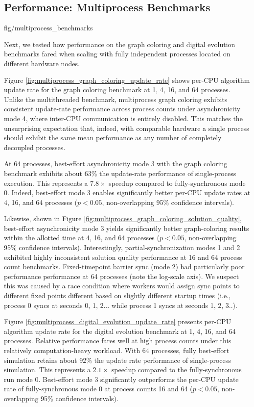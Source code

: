 \subsection{Performance: Multiprocess Benchmarks}
\label{sec:multiprocess-benchmarks}

{fig/multiprocess_benchmarks}

Next, we tested how performance on the graph coloring and digital evolution benchmarks fared when scaling with fully independent processes located on different hardware nodes.

Figure \ref{fig:multiprocess_graph_coloring_update_rate} shows per-CPU algorithm update rate for the graph coloring benchmark at 1, 4, 16, and 64 processes.
Unlike the multithreaded benchmark, multiprocess graph coloring exhibits consistent update-rate performance across process counts under asynchronicity mode 4, where inter-CPU communication is entirely disabled.
This matches the unsurprising expectation that, indeed, with comparable hardware a single process should exhibit the same mean performance as any number of completely decoupled processes.

At 64 processes, best-effort asynchronicity mode 3 with the graph coloring benchmark exhibits about 63\% the update-rate performance of single-process execution.
This represents a $7.8\times$ speedup compared to fully-synchronous mode 0.
Indeed, best-effort mode 3 enables significantly better per-CPU update rates at 4, 16, and 64 processes ($p < 0.05$, non-overlapping 95\% confidence intervals).

Likewise, shown in Figure \ref{fig:multiprocess_graph_coloring_solution_quality}, best-effort asynchronicity mode 3 yields significantly better graph-coloring results within the allotted time at 4, 16, and 64 processes ($p < 0.05$, non-overlapping 95\% confidence intervals).
Interestingly, partial-synchronization modes 1 and 2 exhibited highly inconsistent solution quality performance at 16 and 64 process count benchmarks.
Fixed-timepoint barrier sync (mode 2) had particularly poor performance performance at 64 processes (note the log-scale axis).
We suspect this was caused by a race condition where workers would assign sync points to different fixed points different based on slightly different startup times (i.e., process 0 syncs at seconds 0, 1, 2... while process 1 syncs at seconds 1, 2, 3..).

Figure \ref{fig:multiprocess_digital_evolution_update_rate} presents per-CPU algorithm update rate for the digital evolution benchmark at 1, 4, 16, and 64 processes.
Relative performance fares well at high process counts under this relatively computation-heavy workload.
With 64 processes, fully best-effort simulation retains about 92\% the update rate performance of single-process simulation.
This represents a $2.1\times$ speedup compared to the fully-synchronous run mode 0.
Best-effort mode 3 significantly outperforms the per-CPU update rate of fully-synchronous mode 0 at process counts 16 and 64 ($p < 0.05$, non-overlapping 95\% confidence intervals).
